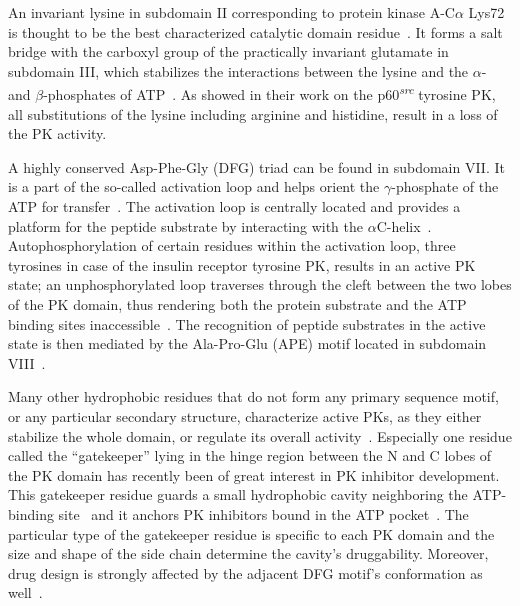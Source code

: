   An invariant lysine in subdomain II corresponding to protein kinase A-C$\alpha$ Lys72 is thought to
  be the best characterized catalytic domain residue~\cite{hanks1988protein}.
  It forms a salt bridge with the carboxyl group of the practically invariant glutamate in
  subdomain III, which stabilizes the interactions between the lysine and the $\alpha$-
  and $\beta$-phosphates of ATP~\cite{hanks1995eukaryotic}.
  As \citet{kamps1986neither} showed in their work on the
  p60\textsuperscript{\textit{src}} tyrosine PK, all substitutions of the lysine including
  arginine and histidine, result in a loss of the PK activity.

  A highly conserved Asp-Phe-Gly (DFG) triad can be found in subdomain VII.
  It is a part of the so-called activation loop and helps orient the $\gamma$-phosphate of
  the ATP for transfer~\cite{hanks1995eukaryotic}.
  The activation loop is centrally located and provides a platform for the peptide
  substrate by interacting with the
  $\alpha$C-helix~\cite{huse2002conformational, mobitz2015abc}.
  Autophosphorylation of certain residues within the activation loop, three tyrosines in
  case of the insulin receptor tyrosine PK, results in an active PK state; an
  unphosphorylated loop traverses through the cleft between the two lobes of the PK
  domain, thus rendering both the protein substrate and the ATP binding sites
  inaccessible~\cite{hubbard1997crystal}.
  The recognition of peptide substrates in the active state is then mediated by the
  Ala-Pro-Glu (APE) motif located in subdomain VIII~\cite{hanks1995eukaryotic}.

  Many other hydrophobic residues that do not form any primary sequence motif, or any
  particular secondary structure, characterize active PKs, as they either stabilize
  the whole domain, or regulate its overall
  activity~\cite{kornev2006surface, kornev2010defining}.
  Especially one residue called the ``gatekeeper'' lying in the hinge region between the N
  and C lobes of the PK domain has recently been of great interest in PK inhibitor
  development.
  This gatekeeper residue guards a small hydrophobic cavity neighboring the ATP-binding
  site~\cite{noble2004protein} and it anchors PK inhibitors bound in the ATP
  pocket~\cite{tong1997highly, azam2008activation}.
  The particular type of the gatekeeper residue is specific to each PK domain and the
  size and shape of the side chain determine the cavity's druggability.
  Moreover, drug design is strongly affected by the adjacent DFG motif's conformation as
  well~\cite{zuccotto2010through}.

